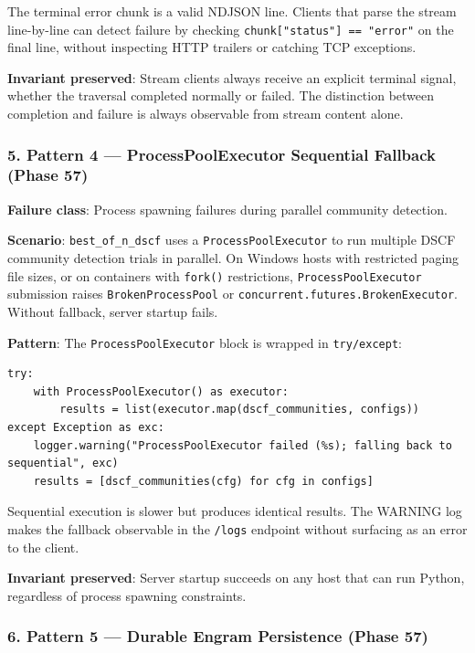 The terminal error chunk is a valid NDJSON line. Clients that parse the stream line-by-line can detect failure by checking \texttt{chunk["status"] == "error"} on the final line, without inspecting HTTP trailers or catching TCP exceptions.

\textbf{Invariant preserved}: Stream clients always receive an explicit terminal signal, whether the traversal completed normally or failed. The distinction between completion and failure is always observable from stream content alone.

\subsubsection{5. Pattern 4 — ProcessPoolExecutor Sequential Fallback (Phase 57)}

\textbf{Failure class}: Process spawning failures during parallel community detection.

\textbf{Scenario}: \texttt{best\_of\_n\_dscf} uses a \texttt{ProcessPoolExecutor} to run multiple DSCF community detection trials in parallel. On Windows hosts with restricted paging file sizes, or on containers with \texttt{fork()} restr\-ictions, \texttt{ProcessPoolExecutor} submission raises \texttt{BrokenProcessPool} or \texttt{concurrent.futures.BrokenExecutor}. Without fallback, server startup fails.

\textbf{Pattern}: The \texttt{ProcessPoolExecutor} block is wrapped in \texttt{try/except}:

\begin{lstlisting}
try:
    with ProcessPoolExecutor() as executor:
        results = list(executor.map(dscf_communities, configs))
except Exception as exc:
    logger.warning("ProcessPoolExecutor failed (%s); falling back to sequential", exc)
    results = [dscf_communities(cfg) for cfg in configs]
\end{lstlisting}

Sequential execution is slower but produces identical results. The WARNING log makes the fallback observable in the \texttt{/logs} endpoint without surfacing as an error to the client.

\textbf{Invariant preserved}: Server startup succeeds on any host that can run Python, regardless of process spawning constraints.

\subsubsection{6. Pattern 5 — Durable Engram Persistence (Phase 57)}

